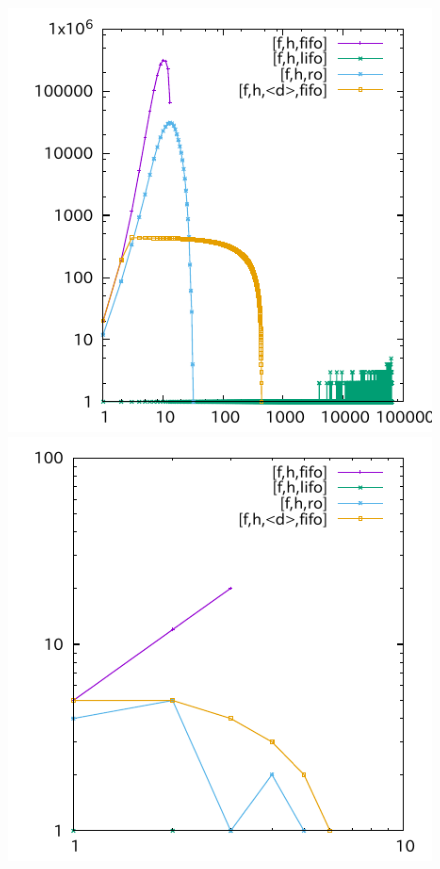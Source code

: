 \begin{figure}[tb]
\includegraphics{img/depth/woodworking-cut/p04.pdf}
\includegraphics{img/depth/zenotravel-fuel/p07.pdf} %

\end{figure}
